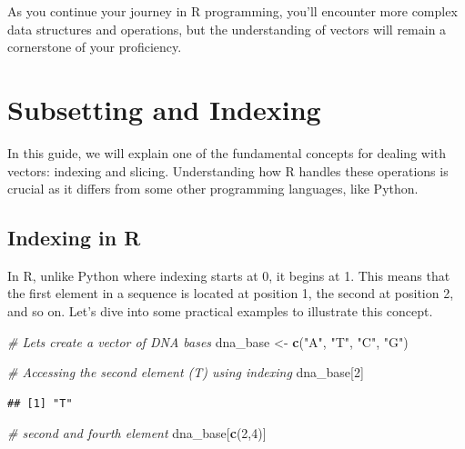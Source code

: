 \documentclass[
]{book}
\newenvironment{Shaded}{\begin{snugshade}}{\end{snugshade}}
\newcommand{\CommentTok}[1]{\textcolor[rgb]{0.56,0.35,0.01}{\textit{#1}}}
\newcommand{\DecValTok}[1]{\textcolor[rgb]{0.00,0.00,0.81}{#1}}
\newcommand{\FunctionTok}[1]{\textcolor[rgb]{0.13,0.29,0.53}{\textbf{#1}}}
\newcommand{\NormalTok}[1]{#1}
\newcommand{\OtherTok}[1]{\textcolor[rgb]{0.56,0.35,0.01}{#1}}
\newcommand{\StringTok}[1]{\textcolor[rgb]{0.31,0.60,0.02}{#1}}
\begin{document}
As you continue your journey in R programming, you'll encounter more complex data structures and operations, but the understanding of vectors will remain a cornerstone of your proficiency.

\hypertarget{subsetting-and-indexing}{%
\section{Subsetting and Indexing}\label{subsetting-and-indexing}}

In this guide, we will explain one of the fundamental concepts for dealing with vectors: indexing and slicing. Understanding how R handles these operations is crucial as it differs from some other programming languages, like Python.

\hypertarget{indexing-in-r}{%
\subsection{Indexing in R}\label{indexing-in-r}}

In R, unlike Python where indexing starts at 0, it begins at 1. This means that the first element in a sequence is located at position 1, the second at position 2, and so on. Let's dive into some practical examples to illustrate this concept.

\begin{Shaded}
\begin{Highlighting}[]
\CommentTok{\# Let\textquotesingle{}s create a vector of DNA bases}
\NormalTok{dna\_base }\OtherTok{\textless{}{-}} \FunctionTok{c}\NormalTok{(}\StringTok{"A"}\NormalTok{, }\StringTok{"T"}\NormalTok{, }\StringTok{"C"}\NormalTok{, }\StringTok{"G"}\NormalTok{)}

\CommentTok{\# Accessing the second element (T) using indexing}
\NormalTok{dna\_base[}\DecValTok{2}\NormalTok{]}
\end{Highlighting}
\end{Shaded}

\begin{verbatim}
## [1] "T"
\end{verbatim}

\begin{Shaded}
\begin{Highlighting}[]
\CommentTok{\# second and fourth element}
\NormalTok{dna\_base[}\FunctionTok{c}\NormalTok{(}\DecValTok{2}\NormalTok{,}\DecValTok{4}\NormalTok{)]}
\end{Highlighting}
\end{Shaded}
\end{document}
